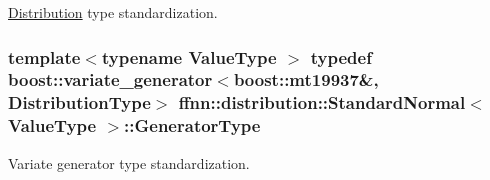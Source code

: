 \hyperlink{classffnn_1_1distribution_1_1_distribution}{Distribution} type standardization. 

\hypertarget{classffnn_1_1distribution_1_1_standard_normal_a1313d5da6529fde723b5297f6d2480e9}{
\subsubsection[{Generator\-Type}]{\setlength{\rightskip}{0pt plus 5cm}template$<$typename Value\-Type $>$ typedef boost\-::variate\-\_\-generator$<$boost\-::mt19937\&, {\bf Distribution\-Type}$>$ {\bf ffnn\-::distribution\-::\-Standard\-Normal}$<$ Value\-Type $>$\-::{\bf Generator\-Type}}}\label{classffnn_1_1distribution_1_1_standard_normal_a1313d5da6529fde723b5297f6d2480e9}


Variate generator type standardization. 



